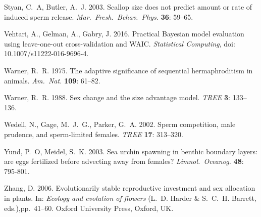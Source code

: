 \documentclass{article}
\begin{document}
\begin{thebibliography}{}
Styan, C.~A, Butler, A.~J. 2003.
\newblock Scallop size does not predict amount or rate of induced sperm release.
\newblock \textit{Mar.~Fresh.~Behav.~Phys.} \textbf{36}: 59--65.

Vehtari, A., Gelman, A., Gabry, J. 2016.
\newblock Practical Bayesian model evaluation using leave-one-out cross-validation and WAIC.
\newblock \textit{Statistical Computing}, doi: 10.1007/s11222-016-9696-4.

Warner, R.~R. 1975.
\newblock The adaptive significance of sequential hermaphroditism in animals.
\newblock \textit{Am.~Nat.} \textbf{109}: 61--82.

Warner, R.~R. 1988.
\newblock Sex change and the size advantage model.
\newblock \textit{TREE} \textbf{3}: 133--136.

Wedell, N., Gage, M.~J.~G., Parker, G.~A. 2002.
\newblock Sperm competition, male prudence, and sperm-limited females.
\newblock \textit{TREE} \textbf{17}: 313--320.

Yund, P.~O, Meidel, S.~K. 2003.
\newblock Sea urchin spawning in benthic boundary layers: are eggs fertilized before advecting away from females?
\newblock \textit{Limnol.~Oceanog.} \textbf{48}: 795-801.

Zhang, D. 2006.
\newblock Evolutionarily stable reproductive investment and sex allocation in plants.
\newblock In: \textit{Ecology and evolution of flowers} (L.~D. Harder \& S.~C.~H. Barrett, eds.),pp.~41--60. Oxford University Press, Oxford, UK.


\end{thebibliography}
\end{document}
